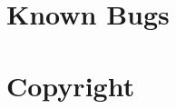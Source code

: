 \documentclass[10pt]{article}
\begin{document}


\appendix{}

\section{Known Bugs}
\label{app-bugs}

\section{Copyright}
\label{app-copyright}
\end{document}
